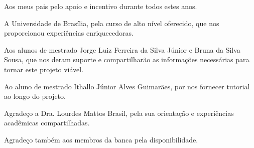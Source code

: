 \begin{agradecimentos}
Aos meus pais pelo apoio e incentivo durante todos estes anos.

A Universidade de Brasília, pela curso de alto nível oferecido, que nos proporcionou experiências enriquecedoras.

Aos alunos de mestrado Jorge Luiz Ferreira da Silva Júnior e Bruna da Silva Sousa, que nos deram suporte e compartilharão as informações necessárias para tornar este projeto viável.

Ao aluno de mestrado Ithallo Júnior Alves Guimarães, por nos fornecer tutorial ao longo do projeto.

Agradeço a Dra. Lourdes Mattos Brasil, pela sua orientação e experiências acadêmicas compartilhadas.

Agradeço também aos membros da banca pela disponibilidade.    

\end{agradecimentos}

